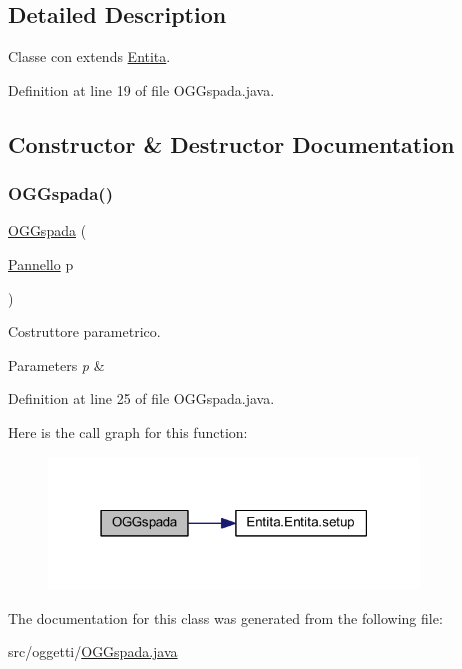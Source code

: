 \subsection{Detailed Description}
Classe con extends \hyperlink{namespace_entita}{Entita}. 

Definition at line 19 of file O\+G\+Gspada.\+java.



\subsection{Constructor \& Destructor Documentation}
\mbox{\label{classoggetti_1_1_o_g_gspada_aaf8eb1525cea36aaf15c9a4045f0c0a0}} 
\subsubsection{\texorpdfstring{O\+G\+Gspada()}{OGGspada()}}
{\footnotesize\ttfamily \hyperlink{classoggetti_1_1_o_g_gspada}{O\+G\+Gspada} (\begin{DoxyParamCaption}\item[{\hyperlink{classa_1_1survival_1_1game_1_1_pannello}{Pannello}}]{p }\end{DoxyParamCaption})}



Costruttore parametrico. 


\begin{DoxyParams}{Parameters}
{\em p} & \\
\hline
\end{DoxyParams}


Definition at line 25 of file O\+G\+Gspada.\+java.

Here is the call graph for this function\+:
\nopagebreak
\begin{figure}[H]
\begin{center}
\leavevmode
\includegraphics[width=279pt]{classoggetti_1_1_o_g_gspada_aaf8eb1525cea36aaf15c9a4045f0c0a0_cgraph}
\end{center}
\end{figure}


The documentation for this class was generated from the following file\+:\begin{DoxyCompactItemize}
\item 
src/oggetti/\hyperlink{_o_g_gspada_8java}{O\+G\+Gspada.\+java}\end{DoxyCompactItemize}
